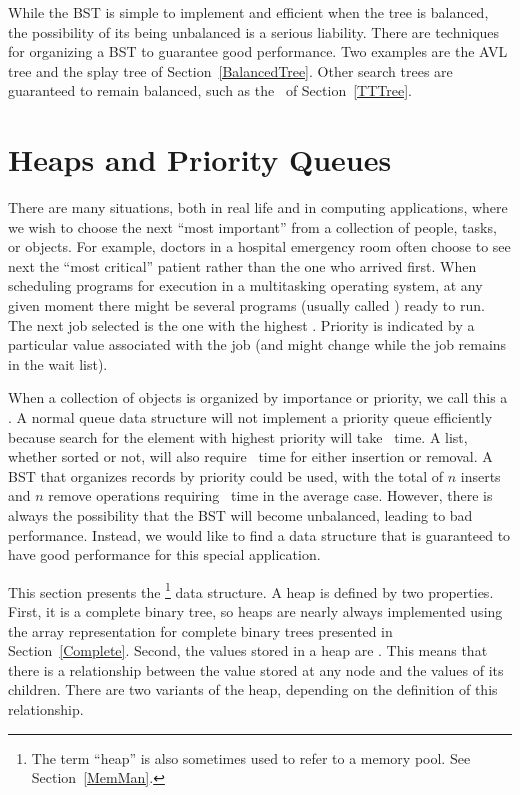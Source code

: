 While the BST is simple to implement and efficient when the tree is
balanced, the possibility of its being unbalanced is a serious
liability.
There are techniques for organizing a BST to guarantee good performance.
Two examples are the AVL tree and the splay tree of
Section~\ref{BalancedTree}.
Other search trees are guaranteed to remain
balanced, such as the \TTtree\ of
Section~\ref{TTTree}.

\section{Heaps and Priority Queues}
\label{HeapSec}

There are many situations, both in real life and in computing
applications, where we wish to choose the next ``most important''
from a collection of people, tasks, or objects.
For example, doctors in a hospital emergency room often choose to see
next the ``most critical'' patient rather than the one who arrived
first.
When scheduling programs for execution in a multitasking
operating system, at any given moment there
might be several programs (usually called ) ready to run.
The next job selected is the one with the highest .
Priority is indicated by a particular value associated with the job
(and might change while the job remains in the wait list).

When a collection of objects is organized by importance or priority,
we call this a .
A normal queue data structure will not implement a priority queue
efficiently because search for the element with highest priority will
take \Thetan\ time.
A list, whether sorted or not, will also require \Thetan\ time for
either insertion or removal.
A BST that organizes records by priority could be used, with the total 
of \(n\) inserts and \(n\) remove operations
requiring \Thetanlogn\ time in the average case.
However, there is always the possibility that the BST will become
unbalanced, leading to bad performance.
Instead, we would like to find a data structure that is guaranteed to
have good performance for this special application.

This section presents the \footnote{The term ``heap'' is
also sometimes used to refer to a memory pool.
See Section~\ref{MemMan}.}
data structure.
A heap is defined by two properties.
First, it is a complete binary tree,
so heaps are nearly always implemented using
the array representation for complete binary trees presented
in Section~\ref{Complete}.
Second, the values stored in a heap are
.
This means that there is a relationship between the value stored at
any node and the values of its children.
There are two variants of the heap, depending on the definition of
this relationship.


